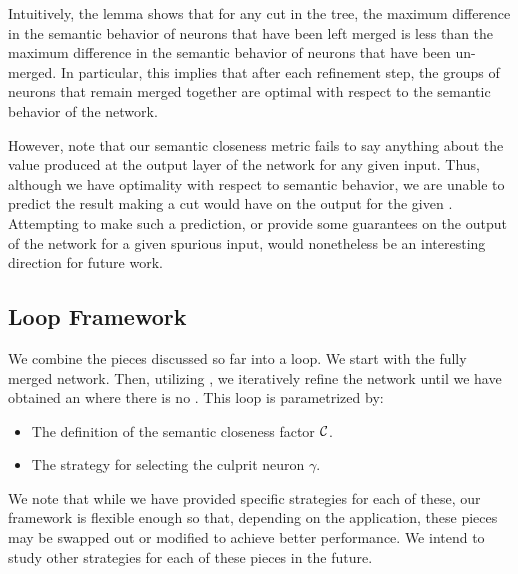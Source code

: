Intuitively, the lemma shows that for any cut in the tree, the
maximum difference in the semantic behavior of neurons that have been left
merged is less than the maximum difference in the semantic behavior of neurons
that have been un-merged. In particular, this implies that after each refinement
step, the groups of neurons that remain merged together are optimal with respect
to the semantic behavior of the network.

However, note that our semantic closeness metric fails to say anything about the
value produced at the output layer of the network for any given input. Thus,
although we have optimality with respect to semantic behavior, we are unable to
predict the result making a cut would have on the output for the given \gencex.
Attempting to make such a prediction, or provide some guarantees on the output
of the network for a given spurious input, would nonetheless be an interesting
direction for future work.

\subsection{\cegar Loop Framework}
\label{s:abs-ref-fw}

We combine the pieces discussed so far into a \cegar loop.  
We start with the fully merged network. Then, utilizing \gencex, we iteratively
refine the network until we have obtained an \abs where there is no \gencex.
This loop is parametrized by:

\begin{itemize}
    \item The definition of the semantic closeness factor $\mathcal{C}$.
    \item The strategy for selecting the culprit neuron $\gamma$.
\end{itemize}

We note that while we have provided specific strategies for each of these, our
framework is flexible enough so that, depending on the application, these pieces
may be swapped out or modified to achieve better performance. We intend to study
other strategies for each of these pieces in the future.
